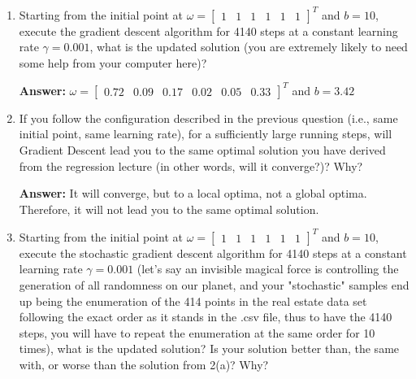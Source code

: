\documentclass{assignment}
\begin{document}
\begin{problem}
\begin{enumerate}
    \begin{enumerate}[label=(\alph*)]

    
        \item Starting from the initial point at $\omega = \begin{bmatrix} 1 & 1 & 1 & 1 & 1 & 1\end{bmatrix}^T$ and $b = 10$, execute the gradient descent algorithm for 4140 steps at a constant learning rate $\gamma = 0.001$, what is the updated solution (you are extremely likely to need some help from your computer here)?

        \color{blue}\textbf{Answer:} $\omega = \begin{bmatrix} 0.72 & 0.09 & 0.17 & 0.02 & 0.05 & 0.33\end{bmatrix}^T$ and $b = 3.42$ \color{black}


        
        \item If you follow the configuration described in the previous question (i.e., same initial point, same learning rate), for a sufficiently large running steps, will Gradient Descent lead you to the same optimal solution you have derived from the regression lecture (in other words, will it converge?)? Why?

        \color{blue}\textbf{Answer:} It will converge, but to a local optima, not a global optima. Therefore, it will not lead you to the same optimal solution.\color{black}


        
        \item Starting from the initial point at $\omega = \begin{bmatrix} 1 & 1 & 1 & 1 & 1 & 1\end{bmatrix}^T$ and $b = 10$, execute the stochastic gradient descent algorithm for 4140 steps at a constant learning rate $\gamma = 0.001$ (let's say an invisible magical force is controlling the generation of all randomness on our planet, and your "stochastic" samples end up being the enumeration of the 414 points in the real estate data set following the exact order as it stands in the .csv file, thus to have the 4140 steps, you will have to repeat the enumeration at the same order for 10 times), what is the updated solution? Is your solution better than, the same with, or worse than the solution from 2(a)? Why?


\end{enumerate}
\end{enumerate}
\end{problem}
\end{document}
